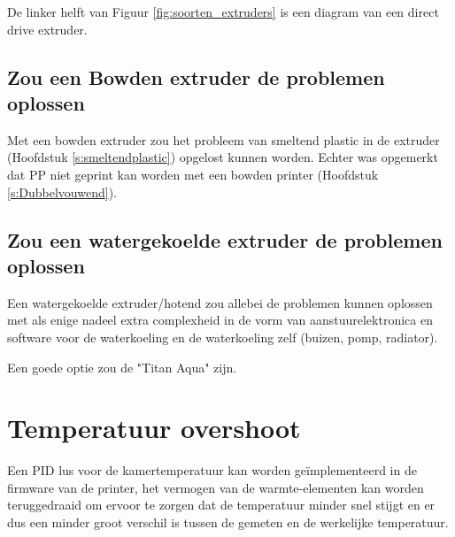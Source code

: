 De linker helft van Figuur \ref{fig:soorten_extruders} \cite{soorten_extruders}
is een diagram van een direct drive extruder.


\subsection{Zou een Bowden extruder de problemen oplossen}

Met een bowden extruder zou het probleem van smeltend plastic in de extruder
(Hoofdstuk \ref{s:smeltendplastic}) opgelost kunnen worden. Echter was
opgemerkt dat PP niet geprint kan worden met een bowden printer (Hoofdstuk
\ref{s:Dubbelvouwend}).

\subsection{Zou een watergekoelde extruder de problemen oplossen}

Een watergekoelde extruder/hotend zou allebei de problemen kunnen oplossen met
als enige nadeel extra complexheid in de vorm van aanstuurelektronica en
software voor de waterkoeling en de waterkoeling zelf (buizen, pomp, radiator).

Een goede optie zou de "Titan Aqua" \cite{titanaqua} zijn.


\section{Temperatuur overshoot}

Een \ac{PID} lus voor de kamertemperatuur kan worden geïmplementeerd in de
firmware van de printer, het vermogen van de warmte-elementen kan worden
teruggedraaid om ervoor te zorgen dat de temperatuur minder snel stijgt en er
dus een minder groot verschil is tussen de gemeten en de werkelijke
temperatuur.
